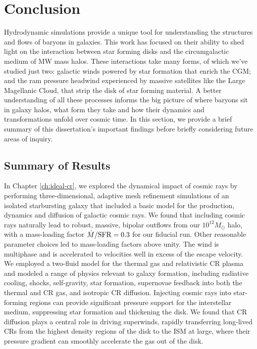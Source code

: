 \chapter[Conclusion]{Conclusion}
\label{ch:conclusion}


Hydrodynamic simulations provide a unique tool for understanding the structures and flows of baryons in galaxies. This work has focused on their ability to shed light on the interaction between star forming disks and the circumgalactic medium of MW mass halos. These interactions take many forms, of which we've studied just two: galactic winds powered by star formation that enrich the CGM; and the ram pressure headwind experienced by massive satellites like the Large Magellanic Cloud, that strip the disk of star forming material. A better understanding of all these processes informs the big picture of where baryons sit in galaxy halos, what form they take and how their dynamics and transformations unfold over cosmic time. In this section, we provide a brief summary of this dissertation's important findings before briefly considering future areas of inquiry.


\section{Summary of Results}
\label{sec:summary}

In Chapter \ref{ch:ideal-cr}, we explored the dynamical impact of cosmic rays by performing three-dimensional, adaptive mesh refinement simulations of an isolated starbursting galaxy that included a basic model for the production, dynamics and diffusion of galactic cosmic rays.  We found that including cosmic rays naturally lead to robust, massive, bipolar outflows from our $10^{12}M_\odot$ halo, with a mass-loading factor $\dot{M}/{\rm SFR} = 0.3$ for our fiducial run. Other reasonable parameter choices led to mass-loading factors above unity.  The wind is multiphase and is accelerated to velocities well in excess of the escape velocity.  We employed a two-fluid model for the thermal gas and relativistic CR plasma and modeled a range of physics relevant to galaxy formation, including radiative cooling, shocks, self-gravity, star formation, supernovae feedback into both the thermal and CR gas, and isotropic CR diffusion. Injecting cosmic rays into star-forming regions can provide significant pressure support for the interstellar medium, suppressing star formation and thickening the disk. We found that CR diffusion plays a central role in driving superwinds, rapidly transferring long-lived CRs from the highest density regions of the disk to the ISM at large, where their pressure gradient can smoothly accelerate the gas out of the disk.

